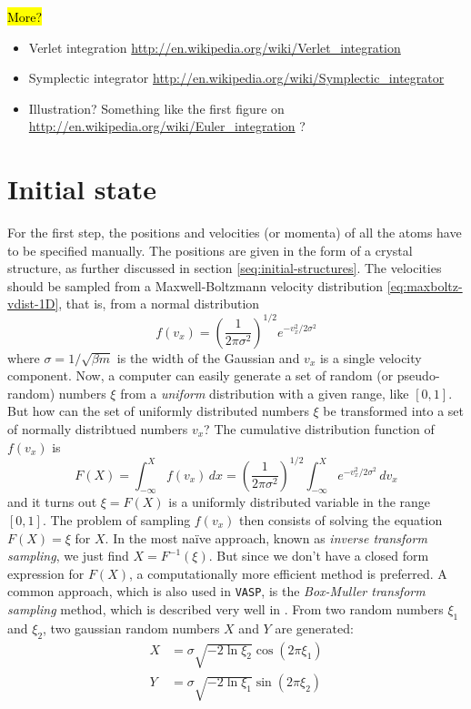 \documentclass[11pt,bibliography=totoc,index=totoc]{scrbook}   %
\newcommand{\comment}[1]{\hl{#1}}
\newcommand{\vasp}{{\texttt{VASP}}} %
\begin{document}
\comment{More?}
\begin{itemize}
  \item 
Verlet integration
\url{http://en.wikipedia.org/wiki/Verlet_integration}
\item
Symplectic integrator
\url{http://en.wikipedia.org/wiki/Symplectic_integrator}
\item 
Illustration? Something like the first figure on
\url{http://en.wikipedia.org/wiki/Euler_integration} ?
\end{itemize}

\section{Initial state}

For the first step, the positions and velocities (or momenta) of all the atoms have to be specified manually. 
The positions are given in the form of a crystal structure, as further discussed in section \ref{seq:initial-structures}.
The velocities should be sampled from a Maxwell-Boltzmann velocity distribution \eqref{eq:maxboltz-vdist-1D},
that is, from a normal distribution
\begin{equation}
    f(v_x) = \left(\frac{1}{2\pi\sigma^2}\right)^{1/2} e^{-v_x^2/2\sigma^2}
  \label{eq:normal-dist}
\end{equation}
where $\sigma=1/\sqrt{\beta m}$ is the width of the Gaussian and $v_x$ is a single velocity component.
Now, a computer can easily generate a set of random (or pseudo-random) numbers $\xi$ from a \emph{uniform} distribution with a given range, like $[0,1]$.
But how can the set of uniformly distributed numbers $\xi$ be transformed into a set of normally distribtued numbers $v_x$?
The cumulative distribution function of $f(v_x)$ is
\begin{equation}
    F(X) = \int_{-\infty}^X f(v_x)\,dx = \left(\frac{1}{2\pi\sigma^2}\right)^{1/2} \int_{-\infty}^X e^{-v_x^2/2\sigma^2} \,dv_x
    \label{eq:CDF}
\end{equation}
and it turns out $\xi = F(X)$ is a uniformly distributed variable in the range $[0,1]$. 
The problem of sampling $f(v_x)$ then consists of solving the equation $F(X)=\xi$ for $X$.
In the most naïve approach, known as \emph{inverse transform sampling}, we just find $X=F^{-1}(\xi)$.
But since we don't have a closed form expression for $F(X)$, a computationally more efficient method is preferred. 
A common approach, which is also used in \vasp, is the \emph{Box-Muller transform sampling} method, which is
described very well in \cite[101]{Tuckerman:2010}. 
From two random numbers $\xi_1$ and $\xi_2$, two gaussian random numbers $X$ and $Y$ are generated:
\begin{align}
    X &= \sigma \sqrt{-2\ln\xi_2} \cos(2\pi\xi_1) \\
    Y &= \sigma \sqrt{-2\ln\xi_1} \sin(2\pi\xi_2)
  \label{eq:box-muller-sampling}
\end{align}
\end{document}
